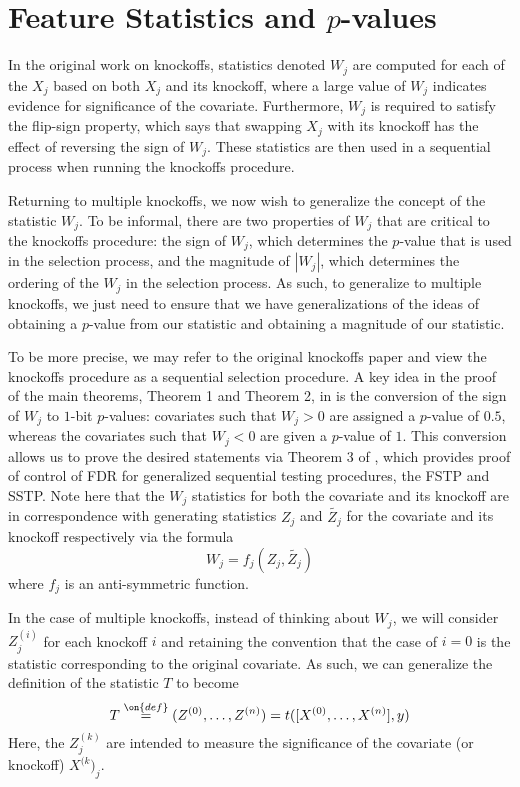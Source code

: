 \documentclass[11pt,reqno]{report}
\theoremstyle{definition}
\numberwithin{equation}{section}
\begin{document}
\section{Feature Statistics and \texorpdfstring{$p$}{p}-values}
In the original work on knockoffs, statistics denoted $W_j$ are computed for each of the $X_j$ based on both $X_j$ and its knockoff, where a large value of $W_j$ indicates evidence for significance of the covariate. Furthermore, $W_j$ is required to satisfy the flip-sign property, which says that swapping $X_j$ with its knockoff has the effect of reversing the sign of $W_j$. These statistics are then used in a sequential process when running the knockoffs procedure.

Returning to multiple knockoffs, we now wish to generalize the concept of the statistic $W_j$. To be informal, there are two properties of $W_j$ that are critical to the knockoffs procedure: the sign of $W_j$, which determines the $p$-value that is used in the selection process, and the magnitude of $|W_j|$, which determines the ordering of the $W_j$ in the selection process. As such, to generalize to multiple knockoffs, we just need to ensure that we have generalizations of the ideas of obtaining a $p$-value from our statistic and obtaining a magnitude of our statistic. 

To be more precise, we may refer to the original knockoffs paper \cite{knockoffs} and view the knockoffs procedure as a sequential selection procedure. A key idea in the proof of the main theorems, Theorem 1 and Theorem 2, in \cite{knockoffs} is the conversion of the sign of $W_j$ to $1$-bit $p$-values: covariates such that $W_j > 0$ are assigned a $p$-value of $0.5$, whereas the covariates such that $W_j < 0$ are given a $p$-value of $1$. This conversion allows us to prove the desired statements via Theorem 3 of \cite{knockoffs}, which provides proof of control of FDR for generalized sequential testing procedures, the FSTP and SSTP. Note here that the $W_j$ statistics for both the covariate and its knockoff are in correspondence with generating statistics $Z_j$ and $\tilde{Z_j}$ for the covariate and its knockoff respectively via the formula
\begin{equation}
W_j = f_j(Z_j, \tilde{Z_j})
\end{equation}
where $f_j$ is an anti-symmetric function. 

In the case of multiple knockoffs, instead of thinking about $W_j$, we will consider $Z_j^{(i)}$ for each knockoff $i$ and retaining the convention that the case of $i = 0$ is the statistic corresponding to the original covariate. As such, we can generalize the definition of the statistic $T$ to become
\begin{equation}
T \overset{\on{def}}{=} (Z^{(0)},\ldots, Z^{(n)}) = t([X^{(0)}, \ldots, X^{(n)}], y)
\end{equation}
Here, the $Z^{(k)}_j$ are intended to measure the significance of the covariate (or knockoff) $X^{(k})_j$. 
\end{document}
